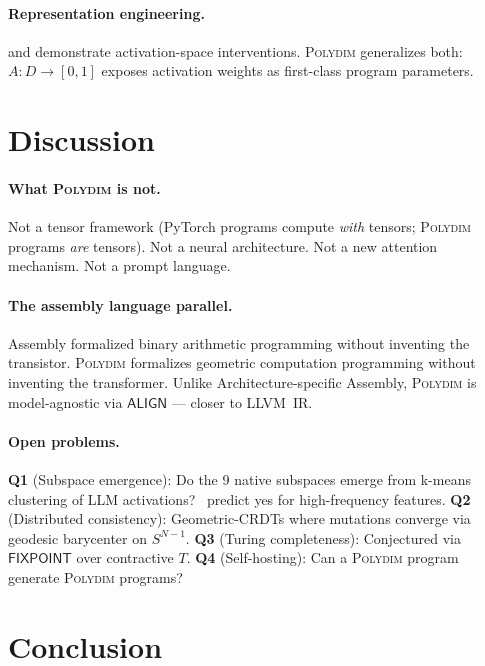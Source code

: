 \documentclass[10pt,twocolumn]{article}
\theoremstyle{plain}
\theoremstyle{definition}
\theoremstyle{remark}
\newcommand{\Fixpoint}{\mathsf{FIXPOINT}}
\newcommand{\Align}{\mathsf{ALIGN}}
\begin{document}
\paragraph{Representation engineering.}
\citet{turner2023activation} and \citet{zou2023representation} demonstrate
activation-space interventions. \textsc{Polydim} generalizes both: $A\colon
D\to[0,1]$ exposes activation weights as first-class program parameters.

\section{Discussion}

\paragraph{What \textsc{Polydim} is not.}
Not a tensor framework (PyTorch programs compute \emph{with} tensors;
\textsc{Polydim} programs \emph{are} tensors). Not a neural architecture.
Not a new attention mechanism. Not a prompt language.

\paragraph{The assembly language parallel.}
Assembly formalized binary arithmetic programming without inventing the
transistor. \textsc{Polydim} formalizes geometric computation programming
without inventing the transformer. Unlike Architecture-specific Assembly,
\textsc{Polydim} is model-agnostic via $\Align$ --- closer to LLVM~IR.

\paragraph{Open problems.}
\textbf{Q1} (Subspace emergence): Do the 9 native subspaces emerge from
k-means clustering of LLM activations?~\citep{suarez2026invariant} predict
yes for high-frequency features.
\textbf{Q2} (Distributed consistency): Geometric-CRDTs where mutations
converge via geodesic barycenter on $S^{N-1}$.
\textbf{Q3} (Turing completeness): Conjectured via $\Fixpoint$ over
contractive $T$.
\textbf{Q4} (Self-hosting): Can a \textsc{Polydim} program generate
\textsc{Polydim} programs?

\section{Conclusion}
\end{document}
